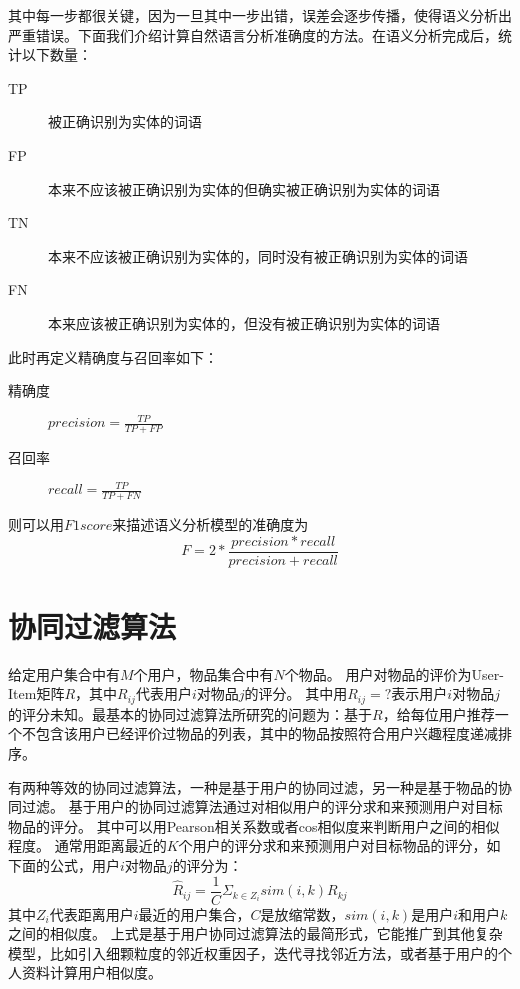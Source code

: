 其中每一步都很关键，因为一旦其中一步出错，误差会逐步传播，使得语义分析出严重错误。下面我们介绍计算自然语言分析准确度的方法。在语义分析完成后，统计以下数量：
\begin{center}
\begin{description}
	\item[TP]
	被正确识别为实体的词语
	\item[FP]
	本来不应该被正确识别为实体的但确实被正确识别为实体的词语
	\item[TN]
	本来不应该被正确识别为实体的，同时没有被正确识别为实体的词语
	\item[FN]
	本来应该被正确识别为实体的，但没有被正确识别为实体的词语
\end{description}
\end{center}
此时再定义精确度与召回率如下：
\begin{center}
\begin{description}
	\item[精确度]
	$precision= \frac{TP}{TP+FP} $
	\item[召回率]
	$recall= \frac{TP}{TP+FN} $
\end{description}
\end{center}
则可以用$F1 score$来描述语义分析模型的准确度为
\[
F= 2* \frac{precision*recall}{precision+recall}
\]
\section{协同过滤算法}
给定用户集合中有$M$个用户，物品集合中有$N$个物品。
用户对物品的评价为User-Item矩阵$R$，其中$R_{ij}$代表用户$i$对物品$j$的评分。
其中用$R_{ij}=?$表示用户$i$对物品$j$的评分未知。最基本的协同过滤算法所研究的问题为：基于$R$，给每位用户推荐一个不包含该用户已经评价过物品的列表，其中的物品按照符合用户兴趣程度递减排序。

有两种等效的协同过滤算法，一种是基于用户的协同过滤，另一种是基于物品的协同过滤。
基于用户的协同过滤算法通过对相似用户的评分求和来预测用户对目标物品的评分\parencite{resnick1994grouplens}。
其中可以用Pearson相关系数或者cos相似度来判断用户之间的相似程度\parencite{Singhal2001Modern}。
通常用距离最近的$K$个用户的评分求和来预测用户对目标物品的评分，如下面的公式，用户$i$对物品$j$的评分为：
\[
	\hat{R}_{ij} = \frac{1}{C} \Sigma_{k\in Z_i}sim(i,k)R_{kj}
\]
其中$Z_i$代表距离用户$i$最近的用户集合，$C$是放缩常数，$sim(i,k)$是用户$i$和用户$k$之间的相似度。
上式是基于用户协同过滤算法的最简形式\parencite{adomavicius2005toward}，它能推广到其他复杂模型，比如引入细颗粒度的邻近权重因子\parencite{herlocker2000explaining}，迭代寻找邻近方法\parencite{Zhang2007A}，或者基于用户的个人资料计算用户相似度\parencite{shi2009exploiting}。

